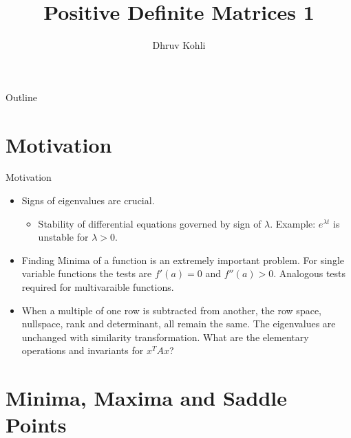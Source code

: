 \documentclass{beamer}
\title{Positive Definite Matrices 1}
\author{Dhruv Kohli}
\institute[Indian Institute of Technology, Guwahati] %
{
  Department of Mathematics\\
  Indian Institute of Technology, Guwahati
}
\date{}
\begin{document}
\setlength{\abovedisplayskip}{1pt}
\setlength{\belowdisplayskip}{1pt}

\begin{frame}
  \titlepage
\end{frame}

\begin{frame}{Outline}
  \tableofcontents
\end{frame}

\section{Motivation}
\begin{frame}{Motivation}{}
  \begin{itemize}
  \item {
   Signs of eigenvalues are crucial.
    \begin{itemize}
        \item Stability of differential equations governed by sign of $\lambda$. Example: $e^{\lambda t}$ is unstable for $\lambda > 0$.
    \end{itemize}
  }
  \item {
    Finding Minima of a function is an extremely important problem. For single variable functions the tests are $f'(a) = 0$ and $f''(a) > 0$. Analogous tests required for multivaraible functions.
  }
  \item {
    When a multiple of one row is subtracted from another, the row space, nullspace, rank and determinant, all remain the same. The eigenvalues are unchanged with similarity transformation. What are the elementary operations and invariants for $x^TAx$?
  }
  \end{itemize}
\end{frame}

\section{Minima, Maxima and Saddle Points}
\end{document}

